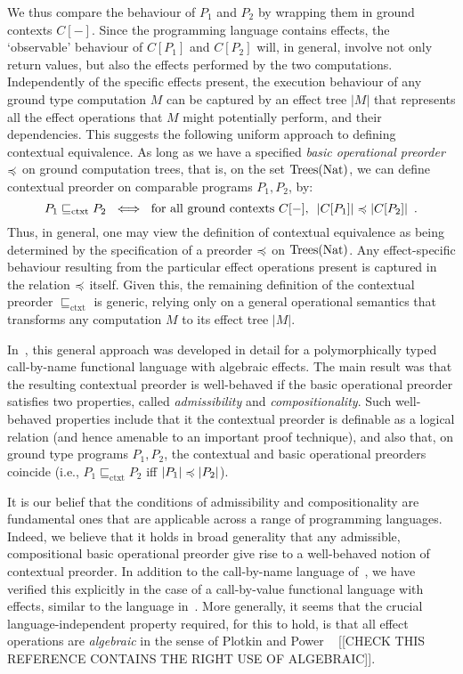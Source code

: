 We thus compare the behaviour of $P_1$ and $P_2$ by wrapping them in ground contexts $C[-]$. Since the programming language contains effects, the `observable'  behaviour of  $C[P_1]$ and $C[P_2]$ will, in general, involve not only return values, but also  the effects performed by the two computations. 
Independently of the specific effects present, the execution behaviour of any ground type computation $M$ can be captured by an effect tree $|M|$ that represents all the effect operations that $M$ might potentially perform, and their dependencies. This suggests the following uniform approach to defining contextual equivalence.  As long as we have a specified \emph{basic operational preorder}  $\preccurlyeq$  on ground  computation trees, that is, on the set $\textnormal{Trees}(\textnormal{Nat})$, we can define 
contextual preorder on comparable programs $P_1,P_2$, by:
\[ P_1 \sqsubseteq_\text{ctxt} P_2 ~ \iff ~
\text{for all ground contexts $C[-]$, $~ |C[P_1]| \preccurlyeq |C[P_2]|$} \enspace . \]
%
Thus, in general, one may view the definition of  contextual equivalence as being determined by the specification of a 
preorder  $\preccurlyeq$  on  $\textnormal{Trees}(\textnormal{Nat})$. Any effect-specific behaviour resulting from  the particular effect operations present is captured in the relation $\preccurlyeq$ itself. Given this, the remaining definition of the contextual preorder $\sqsubseteq_\text{ctxt}$ is generic, relying only on a general operational semantics that transforms any computation $M$ to its effect tree $|M|$.

In~\cite{gom}, this general approach was developed in detail for 
a polymorphically typed call-by-name functional language with algebraic effects. 
The main result was that the resulting contextual preorder is well-behaved if the basic operational preorder satisfies two properties, called \emph{admissibility} and \emph{compositionality}. Such well-behaved properties include that it the contextual preorder is definable as a {logical relation} (and hence amenable to an important proof technique), and also that, on ground type programs $P_1,P_2$,
the contextual and basic operational preorders coincide (i.e., $P_1 \sqsubseteq_\text{ctxt} P_2$ iff 
$|P_1| \preccurlyeq |P_2|$).

It is our belief that the conditions of admissibility and compositionality are fundamental ones that  are applicable
across a range of programming  languages. Indeed, we believe that it holds in broad generality that any
admissible, compositional basic operational preorder  give rise  to a well-behaved notion of contextual preorder. In addition to the 
call-by-name language of~\cite{gom}, we have verified this explicitly in the case of a call-by-value functional language with effects,
similar to the language in~\cite{plotkin2001adequacy}. More generally, it seems  that the crucial language-independent property required, for this to hold, is that all effect operations are \emph{algebraic} in the sense of Plotkin and Power ~\cite{plotkin2001adequacy} [[CHECK THIS REFERENCE CONTAINS THE RIGHT USE OF ALGEBRAIC]].


